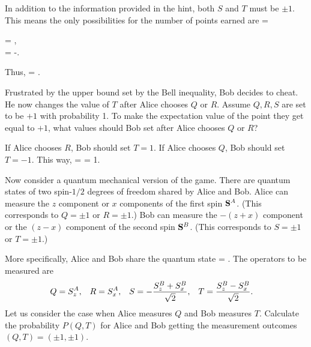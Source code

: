\begin{solution}
	In addition to the information provided in the hint, both $S$ and $T$ must be $\pm1$.  This means the only possibilities for the number of points earned are
	\beq
		 = \begin{cases}
			 = , \\[2ex]
			 = -.
		\end{cases}
	\eeq
	Thus,
	\beq
		\Max = .
	\eeq
	\vfix
\end{solution}



\begin{problem}
	Frustrated by the upper bound set by the Bell inequality, Bob decides to cheat.  He now changes the value of $T$ after Alice chooses $Q$ or $R$.  Assume $Q,R,S$ are set to be $+1$ with probability 1.  To make the expectation value of the point they get equal to $+1$, what values should Bob set after Alice chooses $Q$ or $R$?
\end{problem}

\begin{solution}
	If Alice chooses $R$, Bob should set $T = 1$.  If Alice chooses $Q$, Bob should set $T = -1$.  This way,
	\beq
		= 
		= 1.
	\eeq
	\vfix
\end{solution}



\newcommand{\kQp}{\ket{Q_+}}
\newcommand{\kQm}{\ket{Q_-}}
\newcommand{\kTp}{\ket{T_+}}
\newcommand{\kTm}{\ket{T_-}}
\newcommand{\Apm}{A_\pm}

\newcommand{\sig}{\sigma}
\newcommand{\sigq}{\sig_1}
\newcommand{\sigw}{\sig_2}
\newcommand{\sige}{\sig_3}

\begin{problem}
	Now consider a quantum mechanical version of the game.  There are quantum states of two spin-$1/2$ degrees of freedom shared by Alice and Bob.  Alice can measure the $z$ component or $x$ components of the first spin $\vb{S}^A$.  (This corresponds to $Q = \pm1$ or $R = \pm1$.)  Bob can measure the $-(z+x)$ component or the $(z-x)$ component of the second spin $\vb{S}^B$.  (This corresponds to $S = \pm1$ or $T = \pm1$.)
	
	More specifically, Alice and Bob share the quantum state
	\beq
		\kpsi = .
	\eeq
	The operators to be measured are
	\begin{align*}
		Q &= S_z^A, &
		R &= S_x^A, &
		S &= -\frac{S_z^B + S_x^B}{\sqrt{2}}, &
		T &= \frac{S_z^B - S_x^B}{\sqrt{2}}.
	\end{align*}
	Let us consider the case when Alice measures $Q$ and Bob measures $T$.  Calculate the probability $P(Q, T)$ for Alice and Bob getting the measurement outcomes $(Q, T) = (\pm1, \pm1)$.
\end{problem}

